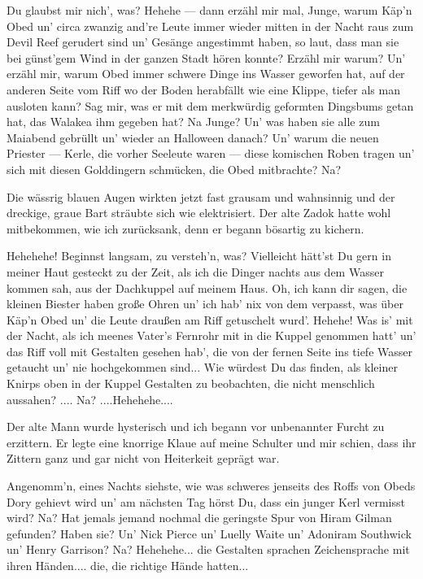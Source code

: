 \glqq Du glaubst mir nich', was? Hehehe --- dann erzähl mir mal, Junge, warum Käp'n Obed un' circa zwanzig and're Leute immer wieder mitten in der Nacht raus zum Devil Reef gerudert sind un' Gesänge angestimmt haben, so laut, dass man sie bei günst'gem Wind in der ganzen Stadt hören konnte? Erzähl mir warum? Un' erzähl mir, warum Obed immer schwere Dinge ins Wasser geworfen hat,  auf der anderen Seite vom Riff wo der Boden herabfällt wie eine Klippe, tiefer als man ausloten kann? Sag mir, was er mit dem merkwürdig geformten Dingsbums getan hat, das Walakea ihm gegeben hat? Na Junge? Un' was haben sie alle zum Maiabend gebrüllt un' wieder an Halloween danach? Un' warum die neuen Priester --- Kerle, die vorher Seeleute waren --- diese komischen Roben tragen un' sich mit diesen Golddingern schmücken, die Obed mitbrachte? Na?\grqq

Die wässrig blauen Augen wirkten jetzt fast grausam und wahnsinnig und der dreckige, graue Bart sträubte sich wie elektrisiert. Der alte Zadok hatte wohl mitbekommen, wie ich zurücksank, denn er begann bösartig zu kichern.

\glqq Hehehehe! Beginnst langsam, zu versteh'n, was? Vielleicht hätt'st Du gern in meiner Haut gesteckt zu der Zeit, als ich die Dinger nachts aus dem Wasser kommen sah, aus der Dachkuppel auf meinem Haus. Oh, ich kann dir sagen, die kleinen Biester haben große Ohren un' ich hab' nix von dem verpasst, was über Käp'n Obed un' die Leute draußen am Riff getuschelt wurd'. Hehehe! Was is' mit der Nacht, als ich meenes Vater's Fernrohr mit in die Kuppel genommen hatt' un' das Riff voll mit Gestalten gesehen hab', die von der fernen Seite ins tiefe Wasser getaucht un' nie hochgekommen sind... Wie würdest Du das finden, als kleiner Knirps oben in der Kuppel Gestalten zu beobachten, die nicht menschlich aussahen? .... Na? ....Hehehehe....\grqq

Der alte Mann wurde hysterisch und ich begann vor unbenannter Furcht zu erzittern. Er legte eine knorrige Klaue auf meine Schulter und mir schien, dass ihr Zittern ganz und gar nicht von Heiterkeit geprägt war.

\glqq Angenomm'n, eines Nachts siehste, wie was schweres jenseits des Roffs von Obeds Dory gehievt wird un' am nächsten Tag hörst Du, dass ein junger Kerl vermisst wird? Na? Hat jemals jemand nochmal die geringste Spur von Hiram Gilman gefunden? Haben sie? Un' Nick Pierce un' Luelly Waite un' Adoniram Southwick un' Henry Garrison? Na? Hehehehe... die Gestalten sprachen Zeichensprache mit ihren Händen.... die, die richtige Hände hatten...

